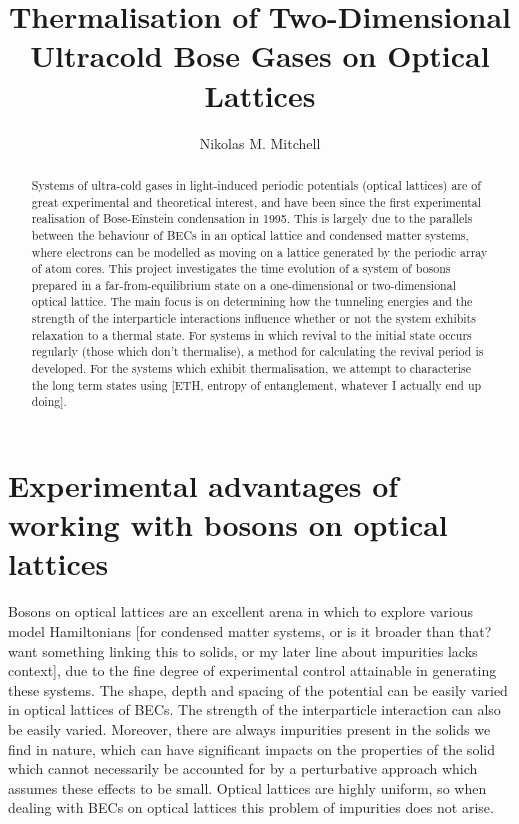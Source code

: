 \documentclass[a4paper,10pt]{article}
\title{Thermalisation of Two-Dimensional Ultracold Bose Gases on Optical Lattices}
\author{Nikolas M. Mitchell}
\begin{document}
\maketitle

\begin{abstract}

Systems of ultra-cold gases in light-induced periodic potentials (optical lattices) are of great experimental and theoretical interest, and have been since the first experimental 
realisation of Bose-Einstein condensation in 1995. 
This is largely due to the parallels between the behaviour of BECs in an optical lattice and condensed matter systems, where 
electrons can be modelled as moving on a lattice generated by the periodic array of atom cores\cite{Bloch2012}. This project 
investigates the time evolution of a system of bosons prepared in a far-from-equilibrium state on a one-dimensional or two-dimensional
optical lattice. The main focus is on determining how the tunneling energies and the strength of the interparticle interactions influence
whether or not the system exhibits relaxation to a thermal state. For systems in which revival to the initial state occurs regularly (those which don't thermalise), 
a method for calculating the revival period is developed. For the systems which exhibit thermalisation, we attempt to characterise the long term
states using [ETH, entropy of entanglement, whatever I actually end up doing].



\end{abstract}
\newpage
\section{Experimental advantages of working with bosons on optical lattices}
Bosons on optical lattices are an excellent arena in which to explore various model Hamiltonians [for condensed matter systems, or is it broader than that?
want something linking this to solids, or my later line about impurities lacks context], due to the 
fine degree of experimental control attainable in generating these systems.
The shape, depth and spacing of the potential can be easily varied in optical lattices of BECs\cite{Morsch2006}. 
The strength of the interparticle interaction can also be easily varied. 
Moreover, there are always impurities present in the solids we find in nature,
which can have significant impacts on the properties of the solid which cannot necessarily be accounted for by a perturbative approach which assumes these effects 
to be small. Optical lattices are highly uniform, so when dealing with BECs on optical lattices this problem of impurities does not arise.
\end{document}
